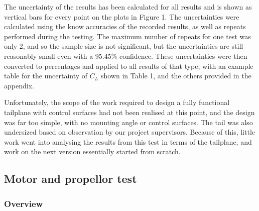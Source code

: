 \documentclass[../../main.tex]{subfiles}
\begin{document}
The uncertainty of the results has been calculated for all results and is shown as vertical bars for every point on the plots in Figure 1.
The uncertainties were calculated using the know accuracies of the recorded results, as well as repeats performed during the testing.
The maximum number of repeats for one test was only 2, and so the sample size is not significant, but the uncertainties are still reasonably small even with a 95.45\% confidence.
These uncertainties were then converted to percentages and applied to all results of that type, with an example table for the uncertainty of $C_L$ shown in Table 1, and the others provided in the appendix. 


Unfortunately, the scope of the work required to design a fully functional tailplane with control surfaces had not been realised at this point, and the design was far too simple, with no mounting angle or control surfaces.
The tail was also undersized based on observation by our project supervisors.
Because of this, little work went into analysing the results from this test in terms of the tailplane, and work on the next version essentially started from scratch. 

\subsection{Motor and propellor test} \label{sec:design-process:interim-design-review:motor-and-propellor-test}

\subsubsection{Overview} \label{sec:design-process:interim-design-review:motor-and-propellor-test:overview}

\end{document}
